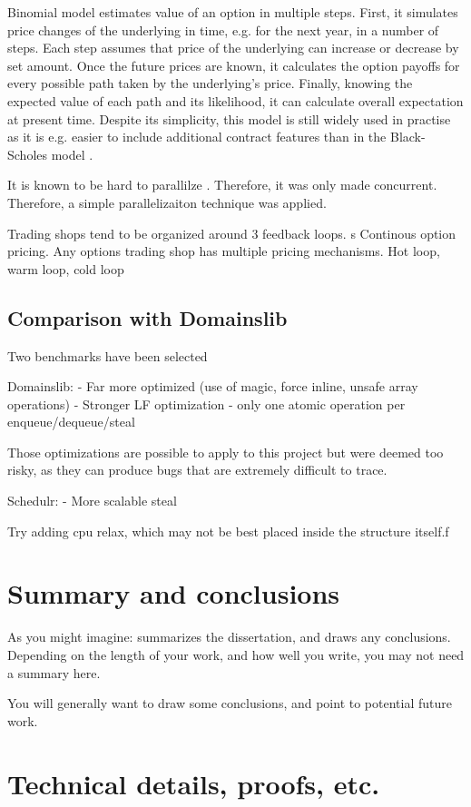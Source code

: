 \documentclass[12pt,a4paper,twoside]{report}
\begin{document}
Binomial model estimates value of an option in multiple steps. First, it simulates price changes of the underlying in time, e.g. for the next year, in a number of steps. Each step assumes that price of the underlying can increase or decrease by set amount. Once the future prices are known, it calculates the option payoffs for every possible path taken by the underlying's price. Finally, knowing the expected value of each path and its likelihood, it can calculate overall expectation at present time. Despite its simplicity, this model is still widely used in practise as it is e.g. easier to include additional contract features than in the Black-Scholes model . 




It is known to be hard to parallilze . Therefore, it was only made concurrent. Therefore, a simple parallelizaiton technique was applied. 

Trading shops tend to be organized around 3 feedback loops. s
Continous option pricing. 
Any options trading shop has multiple pricing mechanisms. Hot loop, warm loop, cold loop

\section{Comparison with Domainslib}
\label{section:result_with_domainslib}
Two benchmarks have been selected 


Domainslib:
- Far more optimized (use of magic, force inline, unsafe array operations)
- Stronger LF optimization - only one atomic operation per enqueue/dequeue/steal 

Those optimizations are possible to apply to this project but were deemed too risky, as they can produce bugs that are extremely difficult to trace. 

Schedulr: 
- More scalable steal 

Try adding cpu relax, which may not be best placed inside the structure itself.f


\chapter{Summary and conclusions}

As you might imagine: summarizes the dissertation, and draws any
conclusions. Depending on the length of your work, and how well you
write, you may not need a summary here.

You will generally want to draw some conclusions, and point to
potential future work.

\label{lastcontentpage} %





\appendix


\chapter{Technical details, proofs, etc.}


\label{lastpage}
\end{document}
